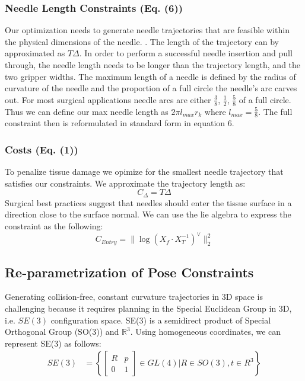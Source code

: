 \documentclass[0-suturing.tex]{subfiles}
\begin{document}
\subsubsection{Needle Length Constraints (Eq. (6)) }
Our optimization needs to generate needle trajectories that are feasible within the physical dimensions of the needle. . 
The length of the trajectory can by approximated as $T\Delta$. In order to perform a successful needle insertion and pull through, the needle length needs to be longer than the trajectory length, and the two gripper widths. 
The maximum length of a needle is defined by the radius of curvature of the needle and the proportion of a full circle the needle's arc carves out. 
For most surgical applications needle arcs are either $\frac{3}{8}$, $\frac{1}{2}$, $\frac{5}{8}$ of a full circle. 
Thus we can define our max needle length as $2 \pi l_{max}r_k$ where $l_{max} = \frac{5}{8}$.
The full constraint then is reformulated in standard form in equation 6.


\subsubsection{Costs (Eq. (1))}
To penalize tissue damage we opimize for the smallest needle trajectory that satisfies our constraints.
We approximate the trajectory length as:
\begin{equation}
    C_{\Delta} = T\Delta 
\end{equation}
Surgical best practices suggest that needles should enter the tissue surface in a direction close to the surface normal.
We can use the lie algebra to express the constraint as the following:
\begin{equation}
    C_{Entry} = \|\log(X_f \cdot X_T^{-1})^{\vee}\|^2_2
\end{equation}


\subsection{\textbf{Re-parametrization of Pose Constraints}}
Generating collision-free, constant curvature trajectories in 3D space is challenging because it requires planning in the Special Euclidean Group in 3D, i.e. $SE(3)$ configuration space.
SE(3) is a semidirect product of Special Orthogonal Group (SO(3)) and $\mathbb{R}^3$. Using homogeneous coordinates, we can represent SE(3) as follows:
\begin{equation}
\begin{aligned}
SE(3) &= \left\{
\begin{bmatrix}
R & p \\
0 & 1
\end{bmatrix}
\in GL(4) \rvert R \in SO(3), t \in R^3 \right\}
\end{aligned}
\end{equation}
\end{document}
